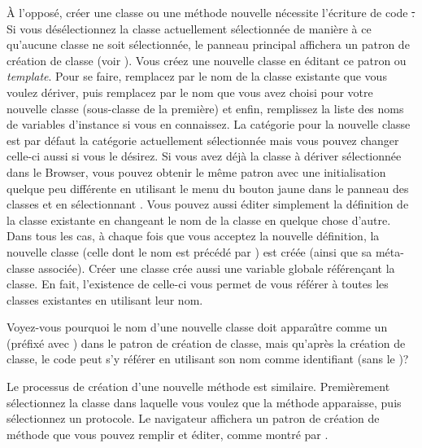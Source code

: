 \documentclass[a4paper,10pt,twoside]{book}
\begin{document}
\`A l'oppos\'e, cr\'eer une classe ou une m\'ethode nouvelle n\'ecessite 
l'\'ecriture de code \st.
Si vous d\'es\'electionnez la classe actuellement s\'electionn\'ee de mani\`ere \`a ce qu'aucune classe ne soit s\'electionn\'ee, le panneau principal 
affichera un patron de cr\'eation de classe
(voir ).
Vous cr\'eez une nouvelle classe en \'editant ce patron ou \emph{template}. Pour se faire, remplacez  par le nom de la classe existante
que vous voulez d\'eriver, puis remplacez  par le nom
que vous avez choisi pour votre nouvelle classe (sous-classe de la premi\`ere) et enfin, remplissez la liste des noms de variables d'instance si vous en connaissez.  
La cat\'egorie pour la nouvelle classe est par d\'efaut la cat\'egorie actuellement s\'electionn\'ee mais vous pouvez changer celle-ci aussi si vous le d\'esirez.
Si vous avez d\'ej\`a la classe \`a d\'eriver s\'electionn\'ee dans 
le Browser, vous pouvez obtenir le m\^eme patron avec une initialisation
quelque peu diff\'erente en utilisant le menu du bouton jaune
dans le panneau des classes et en s\'electionnant 
 .
Vous pouvez aussi \'editer simplement la d\'efinition de la classe existante en changeant le nom de la classe en quelque chose d'autre.
Dans tous les cas, \`a chaque fois que vous acceptez la nouvelle d\'efinition, la nouvelle classe 
(celle dont le nom est pr\'ec\'ed\'e par \ct{#}) est cr\'e\'ee (ainsi que sa m\'eta-classe associ\'ee).  
Cr\'eer une classe cr\'ee aussi une variable globale r\'ef\'eren\c{c}ant
la classe. En fait, l'existence de celle-ci vous permet de vous 
r\'ef\'erer \`a toutes les classes existantes en utilisant leur nom.

Voyez-vous pourquoi le nom d'une nouvelle classe doit appara\^{\i}tre
comme un  (\ie pr\'efix\'e avec \ct{#}) dans le
patron de cr\'eation de classe, mais qu'apr\`es la cr\'eation
de classe, le code peut s'y r\'ef\'erer en utilisant
son nom comme identifiant (\ie sans le \ct{#})?

Le processus de cr\'eation d'une nouvelle m\'ethode
est similaire. Premi\`erement s\'electionnez la classe dans laquelle vous
voulez que la m\'ethode apparaisse, puis s\'electionnez un protocole.
Le navigateur affichera un patron de cr\'eation de m\'ethode que
vous pouvez remplir et \'editer, comme montr\'e par
.
\end{document}
